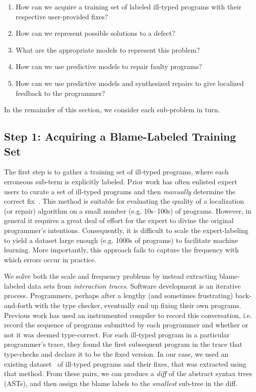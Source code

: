 \begin{enumerate}
  \item How can we acquire a training set of labeled ill-typed programs with
  their respective user-provided fixes?
  \item How can we represent possible solutions to a defect?
  \item What are the appropriate models to represent this problem?
  \item How can we use predictive models to repair faulty programs?
  \item How can we use predictive models and synthesized repairs to give
  localized feedback to the programmer?
\end{enumerate}

In the remainder of this section, we consider each sub-problem in turn.

\subsection{Step 1: Acquiring a Blame-Labeled Training Set}
\label{subsec:step1}

The first step is to gather a training set of ill-typed programs, where each
erroneous sub-term is explicitly labeled. Prior work has often enlisted expert
users to curate a set of ill-typed programs and then \emph{manually} determine
the correct fix~\citep[\eg][]{Lerner2007-dt, Loncaric2016-uk}. This method is
suitable for evaluating the quality of a localization (or repair) algorithm on a
small number (e.g. 10s--100s) of programs. However, in general it requires a
great deal of effort for the expert to divine the original programmer's
intentions. Consequently, it is difficult to scale the expert-labeling to yield
a dataset large enough (e.g. 1000s of programs) to facilitate machine learning.
More importantly, this approach fails to capture the frequency with which errors
occur in practice.

 We solve both the scale and frequency problems by
instead extracting blame-labeled data sets from \emph{interaction traces}.
Software development is an iterative process. Programmers, perhaps after a
lengthy (and sometimes frustrating) back-and-forth with the type checker,
eventually end up fixing their own programs. Previous work has used an
instrumented \ocaml compiler to record this conversation, i.e. record the
sequence of programs submitted by each programmer and whether or not it was
deemed type-correct. For each ill-typed program in a particular programmer's
trace, they found the first subsequent program in the trace that type-checks and
declare it to be the fixed version. In our case, we used an existing
dataset~\citep[][]{yunounderstand, Seidel:2017} of ill-typed programs and their
fixes, that was extracted using that method. From these pairs, we can produce a
\emph{diff} of the abstract syntax trees (ASTs), and then assign the blame
labels to the \emph{smallest} sub-tree in the diff.

